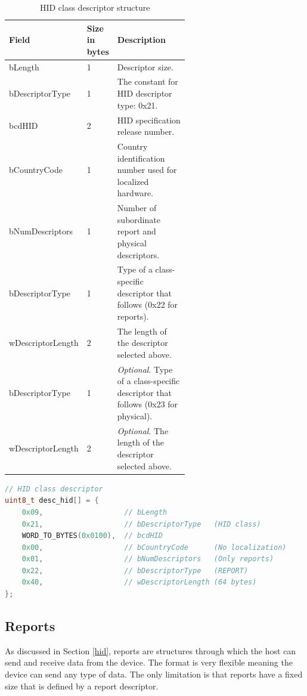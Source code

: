 \begin{table}[ht]
    \centering
    \begin{tabular}{|l|l|p{0.6\linewidth}|} \hline
         \textbf{Field}     &  \thead{\textbf{Size} \\ \textbf{in bytes}} & \textbf{Description} \\ \hline
         bLength            & 1 & Descriptor size. \\ \hline
         bDescriptorType    & 1 & The constant for HID descriptor type: 0x21. \\ \hline
         bcdHID             & 2 & HID specification release number. \\ \hline
         bCountryCode       & 1 & Country identification number used for localized hardware. \\ \hline
         bNumDescriptors    & 1 & Number of subordinate report and physical descriptors. \\ \hline
         bDescriptorType    & 1 & Type of a class-specific descriptor that follows (0x22 for reports). \\ \hline
         wDescriptorLength  & 2 & The length of the descriptor selected above. \\ \hline
         bDescriptorType    & 1 & \emph{Optional}. Type of a class-specific descriptor that follows (0x23 for physical). \\ \hline
         wDescriptorLength  & 2 & \emph{Optional}. The length of the descriptor selected above. \\ \hline
    \end{tabular}
    \caption{HID class descriptor structure}
    \label{tab:hid_descriptor}
\end{table}

\begin{lstlisting}[caption={Example of HID class descriptor in C language},
                   label={lst:hid_example},
                   language=c,
                   float, floatplacement=h]
// HID class descriptor
uint8_t desc_hid[] = {
    0x09,                   // bLength
    0x21,                   // bDescriptorType   (HID class)
    WORD_TO_BYTES(0x0100),  // bcdHID
    0x00,                   // bCountryCode      (No localization)
    0x01,                   // bNumDescriptors   (Only reports)
    0x22,                   // bDescriptorType   (REPORT)
    0x40,                   // wDescriptorLength (64 bytes)
};
\end{lstlisting}

\subsection*{Reports}
\label{reports}
As discussed in Section \ref{hid}, reports are structures through which the host can send and receive data from the device. The format is very flexible meaning the device can send any type of data. The only limitation is that reports have a fixed size that is defined by a report descriptor.

